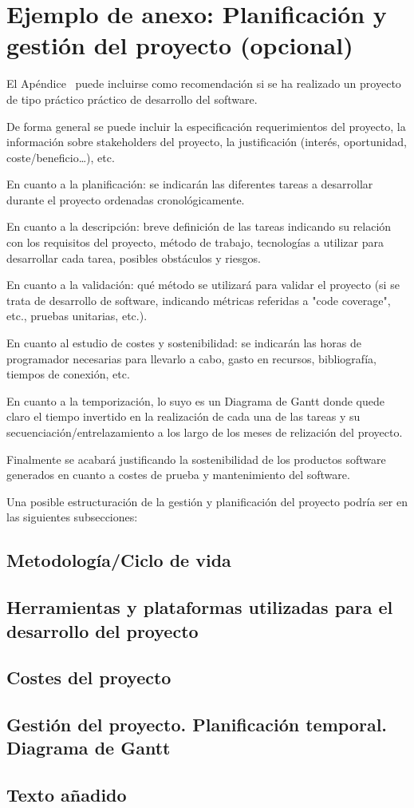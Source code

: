 \chapter{Ejemplo de anexo: Planificación y gestión del proyecto (opcional)}

El Apéndice \thechapter\  puede incluirse como recomendación si se ha realizado un proyecto de tipo práctico práctico de desarrollo del software.

De forma general se puede incluir la especificación requerimientos del proyecto, la información sobre stakeholders del proyecto, la justificación (interés, oportunidad, coste/beneficio…), etc.

En cuanto a la planificación: se indicarán las diferentes tareas a desarrollar durante el proyecto ordenadas cronológicamente.

En cuanto a la descripción: breve definición de las tareas indicando su relación con los requisitos del proyecto, método de trabajo, tecnologías a utilizar para desarrollar cada tarea, posibles obstáculos y riesgos.

En cuanto a la validación: qué método se utilizará para validar el proyecto (si se trata de desarrollo de software, indicando métricas referidas a "code coverage", etc., pruebas unitarias, etc.).

En cuanto al estudio de costes y sostenibilidad: se indicarán las horas de programador necesarias para llevarlo a cabo, gasto en recursos, bibliografía, tiempos de conexión, etc. 

En cuanto a la temporización, lo suyo es un Diagrama de Gantt donde quede claro el tiempo invertido en la realización de cada una de las tareas y su secuenciación/entrelazamiento a los largo de los meses de relización del proyecto.

Finalmente se acabará justificando la sostenibilidad de los productos software generados en cuanto a costes de prueba y mantenimiento del software.

Una posible estructuración  de la gestión y planificación del proyecto podría ser en las siguientes subsecciones:

\section{Metodología/Ciclo de vida} 

\section{Herramientas y plataformas utilizadas para el desarrollo del proyecto}

\section{Costes del proyecto}

\section{Gestión del proyecto. Planificación temporal. Diagrama de Gantt}

\section{Texto añadido}

\lipsum[1-15]